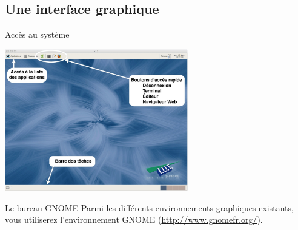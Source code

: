 \subsection{Une interface graphique}
\begin{frame}{Accès au système}
  \begin{center}
    \includegraphics[width=8cm]{img/s01/Gnome_desktop.jpg}
  \end{center}
  \begin{block}{Le bureau GNOME}
    Parmi les différents environnements graphiques existants, vous
    utiliserez l'environnement GNOME (\url{http://www.gnomefr.org/}).
  \end{block}
\end{frame}

